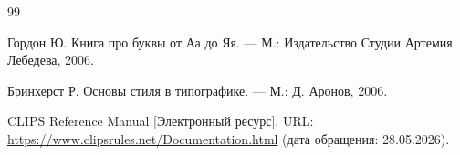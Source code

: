 \begin{thebibliography}{99}

Гордон Ю. Книга про буквы от Аа до Яя. — М.: Издательство Студии Артемия Лебедева, 2006.

Бринхерст Р. Основы стиля в типографике. — М.: Д. Аронов, 2006.

CLIPS Reference Manual [Электронный ресурс]. URL: \url{https://www.clipsrules.net/Documentation.html} (дата обращения: 28.05.2026).

\end{thebibliography}
